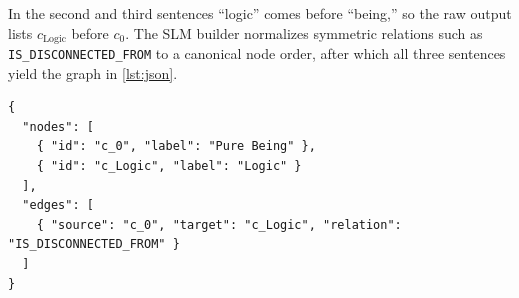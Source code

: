 \documentclass[twocolumn]{ulpaper}
\newcommand{\rel}[1]{\texttt{\small #1}}
\begin{document}
\noindent In the second and third sentences ``logic'' comes before ``being,'' so the raw output lists $c_{\text{Logic}}$ before $c_0$. The SLM builder normalizes symmetric relations such as \rel{IS\_DISCONNECTED\_FROM} to a canonical node order, after which all three sentences yield the graph in \cref{lst:json}.

\begin{lstlisting}[language={}, caption={Normalized structural graph for all three test sentences.}, label={lst:json}]
{
  "nodes": [
    { "id": "c_0", "label": "Pure Being" },
    { "id": "c_Logic", "label": "Logic" }
  ],
  "edges": [
    { "source": "c_0", "target": "c_Logic", "relation": "IS_DISCONNECTED_FROM" }
  ]
}
\end{lstlisting}
\end{document}
